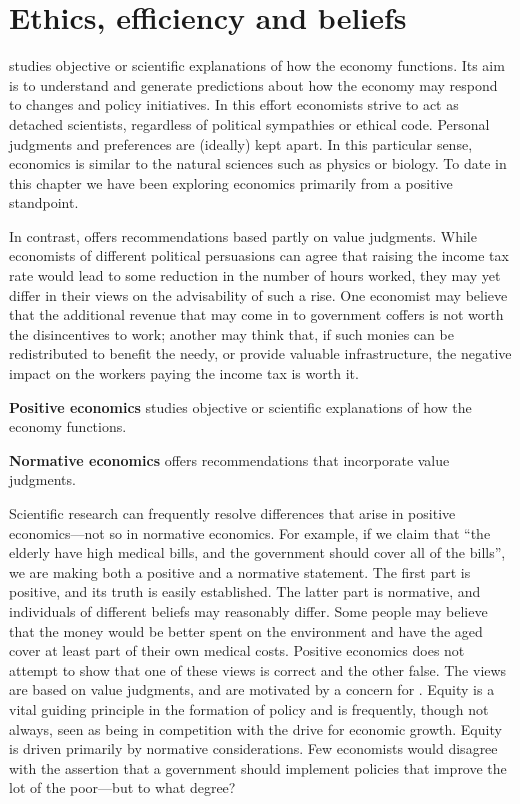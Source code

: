 \section{Ethics, efficiency and beliefs}\label{sec:ch2sec3}

 studies objective or scientific
explanations of how the economy functions. Its aim is to understand and
generate predictions about how the economy may respond to changes and policy
initiatives. In this effort economists strive to act as detached scientists,
regardless of political sympathies or ethical code. Personal judgments and
preferences are (ideally) kept apart. In this particular sense, economics is
similar to the natural sciences such as physics or biology. To date in this
chapter we have been exploring economics primarily from a positive
standpoint.

In contrast,  offers recommendations based
partly on value judgments. While economists of different political
persuasions can agree that raising the income tax rate would lead to some
reduction in the number of hours worked, they may yet differ in their views
on the advisability of such a rise. One economist may believe that the
additional revenue that may come in to government coffers is not worth the
disincentives to work; another may think that, if such monies can be
redistributed to benefit the needy, or provide valuable infrastructure, the
negative impact on the workers paying the income tax is worth it.

\begin{DefBox}
\textbf{Positive economics} studies objective or scientific explanations of how the economy functions.

\textbf{Normative economics} offers recommendations that incorporate value judgments.
\end{DefBox}

\newhtmlpage

Scientific research can frequently resolve differences that arise in
positive economics---not so in normative economics. For example, if we claim
that ``the elderly have high medical bills, and the
government should cover all of the bills'', we are making
both a positive and a normative statement. The first part is positive, and
its truth is easily established. The latter part is normative, and
individuals of different beliefs may reasonably differ. Some people may
believe that the money would be better spent on the environment and have the
aged cover at least part of their own medical costs. Positive economics does
not attempt to show that one of these views is correct and the other false.
The views are based on value judgments, and are motivated by a concern for %
. Equity is a vital guiding principle in the formation
of policy and is frequently, though not always, seen as being in competition
with the drive for economic growth. Equity is driven primarily by normative
considerations. Few economists would disagree with the assertion that a
government should implement policies that improve the lot of the poor---but
to what degree?

